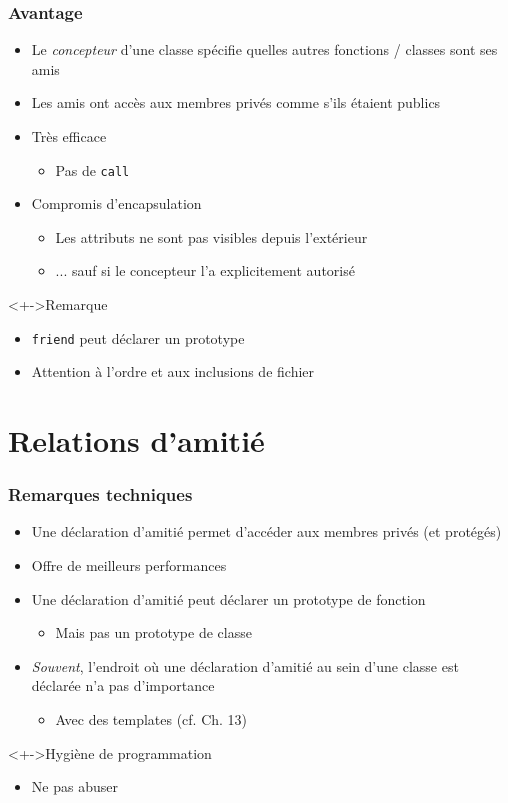 \begin{frame}
\frametitle{Avantage}
\begin{itemize}[<+->]
\item Le \emph{concepteur} d'une classe spécifie quelles autres fonctions / classes sont ses amis
\item Les amis ont accès aux membres privés comme s'ils étaient publics
\item Très efficace
	\begin{itemize}
	\item Pas de \texttt{call}
	\end{itemize}
\item Compromis d'encapsulation
	\begin{itemize}
	\item Les attributs ne sont pas visibles depuis l'extérieur
	\item ... sauf si le concepteur l'a explicitement autorisé
	\end{itemize}
\end{itemize}
\begin{exampleblock}<+->{Remarque}
	\begin{itemize}[<+->]
	\item \lstinline|friend| peut déclarer un prototype
	\item Attention à l'ordre et aux inclusions de fichier
	\end{itemize}
\end{exampleblock}
\end{frame}

\section{Relations d'amitié}

\begin{frame}
\frametitle{Remarques techniques}
\begin{itemize}[<+->]
\item Une déclaration d'amitié permet d'accéder aux membres privés (et protégés)
\item Offre de meilleurs performances
\item Une déclaration d'amitié peut déclarer un prototype de fonction
	\begin{itemize}
	\item Mais pas un prototype de classe
	\end{itemize}
\item \emph{Souvent}, l'endroit où une déclaration d'amitié au sein d'une classe est déclarée n'a pas d'importance
	\begin{itemize}
	\item Avec des templates (cf. Ch. 13)
	\end{itemize}
\end{itemize}
\begin{block}<+->{Hygiène de programmation}
	\begin{itemize}[<+->]
	\item Ne pas abuser
	\end{itemize}
\end{block}
\end{frame}

